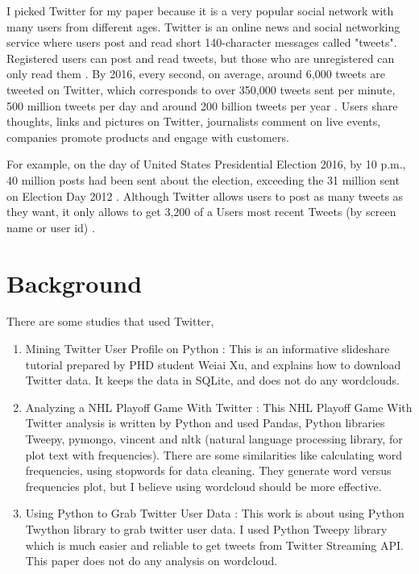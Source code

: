 \documentclass[12pt,notitlepage]{article}
\begin{document}
I picked Twitter for my paper because it is a very popular social network with many users from different ages. Twitter is an online news and social networking service where users post and read short 140-character messages called "tweets". Registered users can post and read tweets, but those who are unregistered can only read them \cite{Wikipedia:2016}. By 2016, every second, on average, around 6,000 tweets are tweeted on Twitter, which corresponds to over 350,000 tweets sent per minute, 500 million tweets per day and around 200 billion tweets per year \cite{Sayce:2010}. Users share thoughts, links and pictures on Twitter, journalists comment on live events, companies promote products and engage with customers.

For example, on the day of United States Presidential Election 2016, by 10 p.m., 40 million posts had been sent about the election, exceeding the 31 million sent on Election Day 2012 \cite{IsaacEmber:2016}. Although Twitter allows users to post as many tweets as they want, it only allows to get 3,200 of a Users most recent Tweets  (by screen name or user id) \cite{UserTimeline:2016}. 


\section{Background}
\label{sec:background}

There are some studies that used Twitter, 
\begin{enumerate}
\item Mining Twitter User Profile on Python \cite{Xu:2014} :  
This is an informative slideshare tutorial prepared by PHD student Weiai Xu, and explains how to download Twitter data. It keeps the data in SQLite, and does not do any wordclouds.


\item Analyzing a NHL Playoff Game With Twitter \cite{Forstyh:2014} :
This NHL Playoff Game With Twitter analysis  is written by Python and used Pandas, Python libraries Tweepy, pymongo, vincent and nltk (natural language processing library, for plot text with frequencies). There are some similarities like calculating word frequencies, using stopwords for data cleaning. They generate word versus frequencies plot, but  I believe using wordcloud should be more effective. 


\item Using Python to Grab Twitter User Data \cite{Saxton:2014} :
This work is about using Python Twython library to grab twitter user data. I used Python Tweepy library which is much easier and reliable to get tweets from Twitter Streaming API. This paper does not do any analysis on wordcloud.

\end{enumerate}
	
\end{document}
